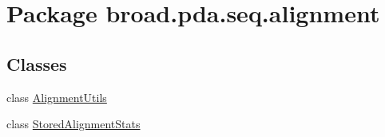 \hypertarget{namespacebroad_1_1pda_1_1seq_1_1alignment}{\section{Package broad.\+pda.\+seq.\+alignment}
\label{namespacebroad_1_1pda_1_1seq_1_1alignment}
}
\subsection*{Classes}
\begin{DoxyCompactItemize}
\item 
class \hyperlink{classbroad_1_1pda_1_1seq_1_1alignment_1_1_alignment_utils}{Alignment\+Utils}
\item 
class \hyperlink{classbroad_1_1pda_1_1seq_1_1alignment_1_1_stored_alignment_stats}{Stored\+Alignment\+Stats}
\end{DoxyCompactItemize}

